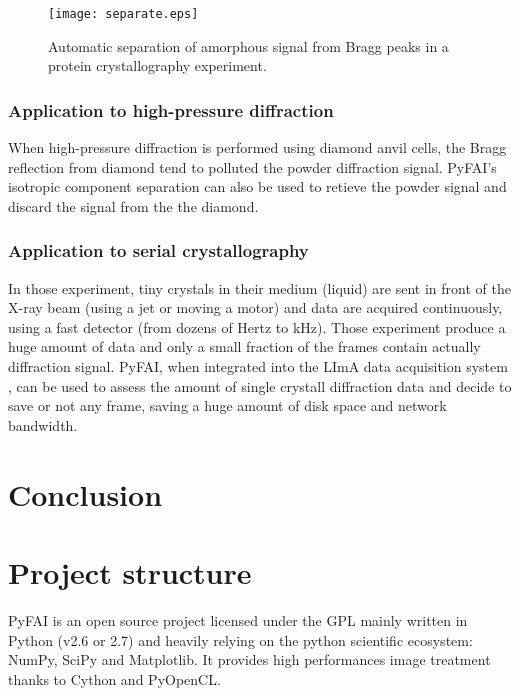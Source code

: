 \documentclass[preprint]{iucr}
\begin{document}
\begin{figure}
\label{separate}
\begin{center}
\texttt{[image: separate.eps]}
\caption{Automatic separation of amorphous signal from Bragg peaks in a
protein crystallography experiment.}
\end{center}
\end{figure}

\subsubsection{Application to high-pressure diffraction}
When high-pressure diffraction is performed using diamond anvil cells, the Bragg
reflection from diamond tend to polluted the powder diffraction signal. PyFAI's
isotropic component separation can also be used to retieve the powder signal and
discard the signal from the the diamond.

\subsubsection{Application to serial crystallography}
In those experiment, tiny crystals in their medium (liquid) are sent in front of
the X-ray beam (using a jet or moving a motor) and data are acquired
continuously, using a fast detector (from dozens of Hertz to kHz).
Those experiment produce a huge amount of data and only a small fraction of the
frames contain actually diffraction signal.
PyFAI, when integrated into the LImA data acquisition system \cite{lima},
can be used to assess the amount of single crystall diffraction data and decide
to save or not any frame, saving a huge amount of disk space and network
bandwidth.



\section{Conclusion}






\appendix
\section{Project structure}
PyFAI is an open source project licensed under the GPL mainly written in Python (v2.6 or 2.7)
and heavily relying on the python scientific ecosystem: NumPy, SciPy and Matplotlib.
It provides high performances image treatment thanks to Cython and PyOpenCL.
\end{document}
